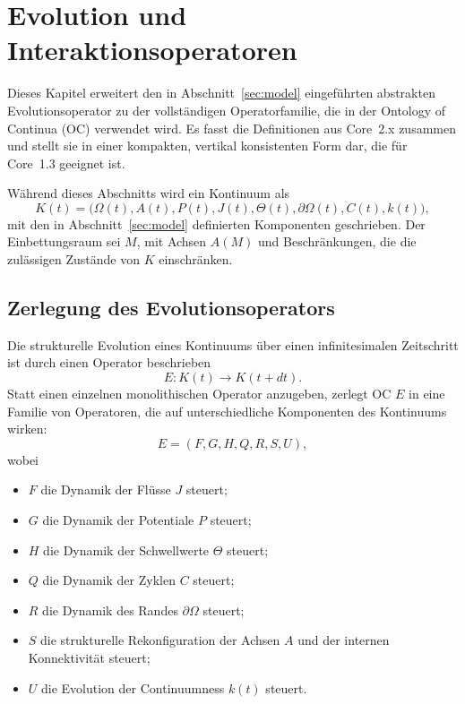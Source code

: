 
\section{Evolution und Interaktionsoperatoren}
\label{sec:operators-full}

Dieses Kapitel erweitert den in
Abschnitt~\ref{sec:model} eingeführten abstrakten Evolutionsoperator
zu der vollständigen Operatorfamilie, die in der Ontology of
Continua (OC) verwendet wird. Es fasst die Definitionen aus Core~2.x
zusammen und stellt sie in einer kompakten, vertikal konsistenten Form dar,
die für Core~1.3 geeignet ist.

Während dieses Abschnitts wird ein Kontinuum als
\[
  K(t) =
  \big(
    \Omega(t), A(t), P(t), J(t),
    \Theta(t), \partial\Omega(t), C(t), k(t)
  \big),
\]
mit den in Abschnitt~\ref{sec:model} definierten Komponenten geschrieben.
Der Einbettungsraum sei \(M\), mit Achsen \(A(M)\) und Beschränkungen,
die die zulässigen Zustände von \(K\) einschränken.

\subsection{Zerlegung des Evolutionsoperators}

Die strukturelle Evolution eines Kontinuums über einen infinitesimalen
Zeitschritt ist durch einen Operator beschrieben
\[
  E : K(t) \longrightarrow K(t+dt).
\]
Statt einen einzelnen monolithischen Operator anzugeben, zerlegt OC \(E\)
in eine Familie von Operatoren, die auf unterschiedliche Komponenten des
Kontinuums wirken:
\[
  E = (F, G, H, Q, R, S, U),
\]
wobei
\begin{itemize}
  \item \(F\) die Dynamik der Flüsse \(J\) steuert;
  \item \(G\) die Dynamik der Potentiale \(P\) steuert;
  \item \(H\) die Dynamik der Schwellwerte \(\Theta\) steuert;
  \item \(Q\) die Dynamik der Zyklen \(C\) steuert;
  \item \(R\) die Dynamik des Randes \(\partial\Omega\) steuert;
  \item \(S\) die strukturelle Rekonfiguration der Achsen \(A\) und
        der internen Konnektivität steuert;
  \item \(U\) die Evolution der Continuumness \(k(t)\) steuert.
\end{itemize}

